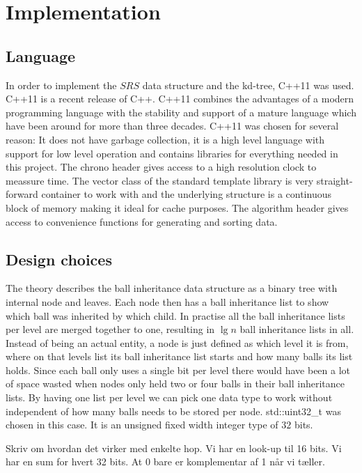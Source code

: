 \chapter{Implementation}

\section{Language}

In order to implement the $SRS$ data structure and the kd-tree, C++11 was used. C++11 is a recent release of C++. C++11 combines the advantages of a modern programming language with the stability and support of a mature language which have been around for more than three decades. C++11 was chosen for several reason: It does not have garbage collection, it is a high level language with support for low level operation and contains libraries for everything needed in this project. The chrono header gives access to a high resolution clock to meassure time. The vector class of the standard template library is very straight-forward container to work with and the underlying structure is a continuous block of memory making it ideal for cache purposes. The algorithm header gives access to convenience functions for generating and sorting data.

\section{Design choices}

The theory describes the ball inheritance data structure as a binary tree with internal node and leaves. Each node then has a ball inheritance list to show which ball was inherited by which child. In practise all the ball inheritance lists per level are merged together to one, resulting in $\lg n$ ball inheritance lists in all. Instead of being an actual entity, a node is just defined as which level it is from, where on that levels list its ball inheritance list starts and how many balls its list holds. Since each ball only uses a single bit per level there would have been a lot of space wasted when nodes only held two or four balls in their ball inheritance lists. By having one list per level we can pick one data type to work without independent of how many balls needs to be stored per node. std::uint32\_t  was chosen in this case. It is an unsigned fixed width integer type of $32$ bits.


Skriv om hvordan det virker med enkelte hop. Vi har en look-up til 16 bits. Vi har en sum for hvert 32 bits. At 0 bare er komplementar af 1 når vi tæller.
